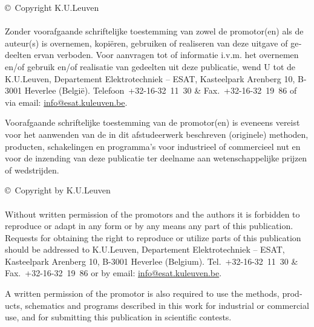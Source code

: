 \begin{otherlanguage}{dutch}
\begin{small}\vspace*{\fill} \copyright\ Copyright K.U.Leuven\\
\\
Zonder voorafgaande schriftelijke toestemming van zowel de
promotor(en) als de auteur(s) is overnemen, kopi\"eren, gebruiken of
realiseren van deze uitgave of gedeelten ervan verboden. Voor
aanvragen tot of informatie i.v.m. het overnemen en/of gebruik
en/of realisatie van gedeelten uit deze publicatie, wend U tot de
K.U.Leuven, Departement Elektrotechniek -- ESAT, Kasteelpark
Arenberg 10, B-3001 Heverlee (Belgi\"e). Telefoon~\mbox{+32-16-32 11
30} \& Fax.~\mbox{+32-16-32 19 86} of via email: \url{info@esat.kuleuven.be}.

Voorafgaande schriftelijke toestemming van de promotor(en) is
eveneens vereist voor het aanwenden van de in dit afstudeerwerk
beschreven (originele) methoden, producten, schakelingen en
programma's voor industrieel of commercieel nut en voor de
inzending van deze publicatie ter deelname aan wetenschappelijke
prijzen of wedstrijden.
\end{small}
\end{otherlanguage}
\vspace*{3cm}

\begin{otherlanguage}{english}
\begin{small}
\copyright\ Copyright by K.U.Leuven\\
\\
Without written permission of the promotors and the authors it is
forbidden to reproduce or adapt in any form or by any means any
part of this publication. Requests for obtaining the right to
reproduce or utilize parts of this publication should be addressed
to K.U.Leuven, Departement Elektrotechniek -- ESAT, Kasteelpark
Arenberg 10,  B-3001 Heverlee  (Belgium). Tel.~\mbox{+32-16-32 11
30}   \& Fax.~\mbox{+32-16-32 19 86} or by email: \url{info@esat.kuleuven.be}.

A written permission of the promotor is also required to use the
methods, products, schematics and programs described in this work
for industrial or commercial use, and for submitting this
publication in scientific contests.
\end{small}
\end{otherlanguage}


